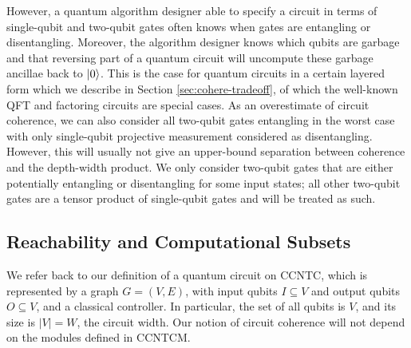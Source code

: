 However, a quantum algorithm designer able to specify a circuit in terms of single-qubit and
two-qubit gates often knows when gates are entangling or disentangling.
Moreover, the algorithm designer knows which qubits are garbage and that reversing
part of a quantum circuit will uncompute these garbage ancillae back to $\left\vert{0}\right\rangle$.
This is
the case for
quantum circuits in a certain layered form which we describe in Section \ref{sec:cohere-tradeoff},
of which 
the 
well-known QFT and factoring circuits are special cases.
As an overestimate of circuit coherence, we can also consider all two-qubit gates entangling in the worst case
with
only single-qubit projective measurement considered as disentangling. However, this will usually
not give an upper-bound separation between coherence and the depth-width product.
We only consider two-qubit gates that are either potentially entangling or disentangling
for some input states; all other two-qubit gates are a tensor product of
single-qubit gates and will be treated as such.

\subsection{Reachability and Computational Subsets}
\label{subsec:cohere-subset}

We refer back to our definition of a quantum circuit on
\textsf{CCNTC}, which is represented by a graph $G = (V,E)$,
with input qubits $I \subseteq V$ and output qubits $O \subseteq V$, and a
classical controller. In particular, the set of all qubits is $V$,
and its size is $|V|=W$, the circuit width.
Our notion of circuit coherence will not depend
on the modules defined in \textsc{CCNTCM}.

